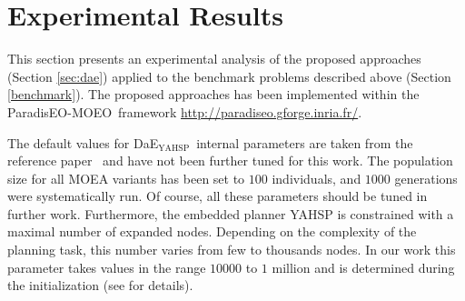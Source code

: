 \documentclass{llncs}
\newcommand{\DAEYAHSP}{{\sc DaE$_{\text{YAHSP}}$}}
\def\PARADISEO{{\sc ParadisEO-MOEO}}
\begin{document}
\section{Experimental Results}
\label{sec:experiments}
This section presents an experimental analysis of the proposed approaches (Section \ref{sec:dae}) applied to the benchmark problems described above (Section \ref{benchmark}). 
The proposed approaches has been implemented within the \PARADISEO\ framework \url{http://paradiseo.gforge.inria.fr/}.

The default values for \DAEYAHSP\ internal parameters are taken from the reference paper~\cite{Bibai2010} and have not been further tuned for this work.
The population size for all MOEA variants has been set to $100$ individuals, and $1000$ generations were systematically run. Of course, all these parameters should be tuned in further work.
Furthermore, the embedded planner YAHSP  is constrained with a maximal number of expanded nodes. Depending on the complexity of the planning task, this number varies
from few  to thousands nodes. In our work this parameter takes values in the range $10 000$ to $1$ million and is determined during the initialization (see \cite{Bibai2010} for details).
\end{document}
